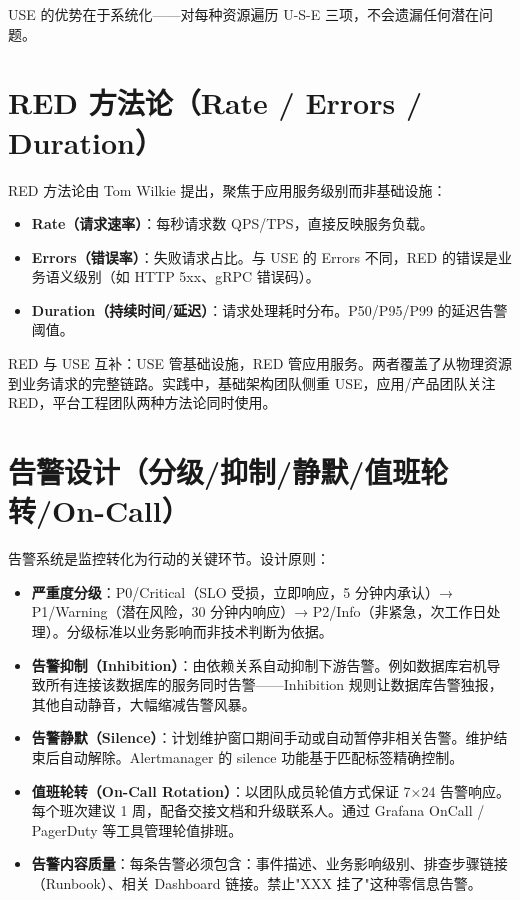 \documentclass[12pt,UTF8]{ctexbook}
\begin{document}
USE 的优势在于系统化——对每种资源遍历 U-S-E 三项，不会遗漏任何潜在问题。

  \section{RED 方法论（Rate / Errors / Duration）}

RED 方法论由 Tom Wilkie 提出，聚焦于应用服务级别而非基础设施：

\begin{itemize}
	\item \textbf{Rate（请求速率）}：每秒请求数 QPS/TPS，直接反映服务负载。
	\item \textbf{Errors（错误率）}：失败请求占比。与 USE 的 Errors 不同，RED 的错误是业务语义级别（如 HTTP 5xx、gRPC 错误码）。
	\item \textbf{Duration（持续时间/延迟）}：请求处理耗时分布。P50/P95/P99 的延迟告警阈值。
\end{itemize}

RED 与 USE 互补：USE 管基础设施，RED 管应用服务。两者覆盖了从物理资源到业务请求的完整链路。实践中，基础架构团队侧重 USE，应用/产品团队关注 RED，平台工程团队两种方法论同时使用。

  \section{告警设计（分级/抑制/静默/值班轮转/On-Call）}

告警系统是监控转化为行动的关键环节。设计原则：

\begin{itemize}
	\item \textbf{严重度分级}：P0/Critical（SLO 受损，立即响应，5 分钟内承认）→ P1/Warning（潜在风险，30 分钟内响应）→ P2/Info（非紧急，次工作日处理）。分级标准以业务影响而非技术判断为依据。
	\item \textbf{告警抑制（Inhibition）}：由依赖关系自动抑制下游告警。例如数据库宕机导致所有连接该数据库的服务同时告警——Inhibition 规则让数据库告警独报，其他自动静音，大幅缩减告警风暴。
	\item \textbf{告警静默（Silence）}：计划维护窗口期间手动或自动暂停非相关告警。维护结束后自动解除。Alertmanager 的 silence 功能基于匹配标签精确控制。
	\item \textbf{值班轮转（On-Call Rotation）}：以团队成员轮值方式保证 7×24 告警响应。每个班次建议 1 周，配备交接文档和升级联系人。通过 Grafana OnCall / PagerDuty 等工具管理轮值排班。
	\item \textbf{告警内容质量}：每条告警必须包含：事件描述、业务影响级别、排查步骤链接（Runbook）、相关 Dashboard 链接。禁止"XXX 挂了"这种零信息告警。
\end{itemize}
\end{document}

